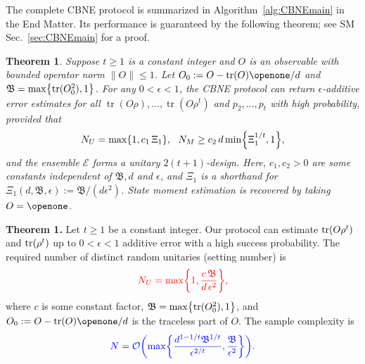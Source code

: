 \documentclass[aps,prl,twocolumn,nofootinbib,superscriptaddress,10pt]{revtex4-2}
\let\originalleft\left
\let\originalright\right
\renewcommand{\left}{\mathopen{}\mathclose\bgroup\originalleft}
\renewcommand{\right}{\aftergroup\egroup\originalright}
\newcommand{\tr}[1]{\mathrm{tr}\left( #1 \right)}
\DeclareMathOperator{\Tr}{tr}
\newcommand{\red}[1]{{\leavevmode\color{red}#1}}
\newcommand{\blue}[1]{{\leavevmode\color{blue}#1}}
\newcommand{\bigo}[1]{\mathcal{O}\left(#1\right)}
\theoremstyle{plain}
\newtheorem{theorem}[thm]{Theorem}
\theoremstyle{definition}
\newcommand{\tref}[1]{Theorem~\ref{#1}}
\begin{document}

The complete CBNE protocol is summarized in Algorithm~\ref{alg:CBNEmain} in the End Matter. Its performance is guaranteed by the following theorem; see SM Sec.~\ref{sec:CBNEmain} for a proof.


\begin{theorem}\label{thm:MomOResult}%
Suppose $t\geq 1$ is a constant integer and $O$ is an observable with bounded operator norm $\|O\|\le 1$. 
Let $O_0:=O-\Tr(O)\openone/d$ and $\mathfrak{B}= \max \left\lbrace \Tr(O_0^2),1\right\rbrace$. 
For any $0<\epsilon<1$, the CBNE protocol can return $\epsilon$-additive error estimates for all $\Tr(O\rho),\dots,\Tr(O\rho^t)$ and $p_2,\dots,p_t$ with high probability, provided that
\begin{align} 
N_U=\max\left\lbrace 1, c_1 \,\Xi_1 \right\rbrace, \ \  
N_M\geq c_2\,d \min\left\lbrace \Xi_1^{1/t}, 1 \right\rbrace, 
\end{align}
and the ensemble $\mathcal E$ forms a unitary $2(t+1)$-design. 
Here, $c_1,c_2>0$ are some constants independent of $\mathfrak{B},d$ and $\epsilon$, and $\Xi_1$ is a shorthand for $\Xi_1(d,\mathfrak{B},\epsilon):=\mathfrak{B}/(d\epsilon^2)$. 
State moment estimation is recovered by taking $O=\openone$.
\end{theorem}




\noindent\textbf{Theorem 1.}
Let $t\geq 1$ be a constant integer.
Our protocol can estimate $\tr{O\rho^t}$ and $\tr{\rho^t}$ up to $0<\epsilon<1$  additive error with a high success probability. 
The required number of distinct random unitaries (setting number) is
\begin{align} 
	\red{N_U=\max\left\lbrace 1, \dfrac{c \,\mathfrak{B}}{d\,\epsilon^2} \right\rbrace ,}\nonumber
\end{align}
where $c$ is some constant factor,  $\mathfrak{B}= \max \left\lbrace \Tr(O_0^2),1\right\rbrace$, and $O_0:=O-\Tr(O)\openone/d$ is the traceless part of $O$.
The sample complexity is 
\begin{align} 
	\blue{N=\bigo{\max\left\lbrace \frac{d^{1-1/t}\mathfrak{B}^{1/t}}{\epsilon^{2/t}}, \dfrac{\mathfrak{B}}{\epsilon^2} \right\rbrace }.}
	\nonumber
\end{align}

\fi

\end{document}
